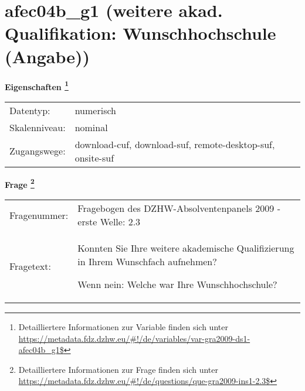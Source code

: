 
    \setcounter{footnote}{0}

    \vspace*{-1.8cm}
	\section{afec04b\_g1 (weitere akad. Qualifikation: Wunschhochschule (Angabe))}
	\label{section:afec04b_g1}



    \vspace*{0.5cm}
    \noindent\textbf{Eigenschaften
	\footnote{Detailliertere Informationen zur Variable finden sich unter
		\url{https://metadata.fdz.dzhw.eu/\#!/de/variables/var-gra2009-ds1-afec04b_g1$}}}\\
	\begin{tabularx}{\hsize}{@{}lX}
	Datentyp: & numerisch \\
	Skalenniveau: & nominal \\
	Zugangswege: &
	  download-cuf, 
	  download-suf, 
	  remote-desktop-suf, 
	  onsite-suf
 \\
    \end{tabularx}



				\vspace*{0.5cm}
                \noindent\textbf{Frage
	                \footnote{Detailliertere Informationen zur Frage finden sich unter
		              \url{https://metadata.fdz.dzhw.eu/\#!/de/questions/que-gra2009-ins1-2.3$}}}\\
				\begin{tabularx}{\hsize}{@{}lX}
					Fragenummer: &
					  Fragebogen des DZHW-Absolventenpanels 2009 - erste Welle:
					  2.3
 \\
					Fragetext: & Konnten Sie Ihre weitere akademische Qualifizierung in Ihrem Wunschfach aufnehmen?\par  Wenn nein: Welche war Ihre Wunschhochschule? \\
				\end{tabularx}





